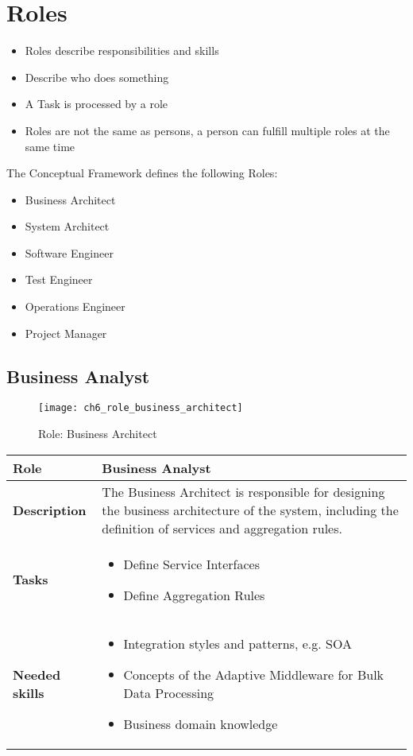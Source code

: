 \section{Roles}
\label{sec:ch6_roles}

\begin{itemize}
	\item Roles describe responsibilities and skills
	\item Describe who does something
	\item A Task is processed by a role
	\item Roles are not the same as persons, a person can fulfill multiple roles at the same time
\end{itemize}

The Conceptual Framework defines the following Roles:
\begin{itemize}
	\item Business Architect
	\item System Architect 
	\item Software Engineer
	\item Test Engineer
	\item Operations Engineer
	\item Project Manager
\end{itemize}

\subsection{Business Analyst}

\begin{figure}[htpb] \centering 
	\texttt{[image: ch6\_role\_business\_architect]} 
	\caption{Role: Business Architect} 
	\label{fig:ch6_role_business_architect} 
\end{figure}

\begin{tabularx}{\textwidth}{@{} l X @{}}
	\caption{Business Architect} \label{table:ch6_Role_Business_Analysist}\\
	\toprule
	\bfseries Role & Business Analyst\\
	\midrule
	\bfseries Description & The Business Architect is responsible for designing the business architecture of the system, including the definition of services and aggregation rules.\\
	\midrule
	\bfseries Tasks & 
	\begin{itemize}
		\item Define Service Interfaces
		\item Define Aggregation Rules
	\end{itemize}
	\\
	\midrule 
	\bfseries Needed skills &
	\begin{itemize}
		\item Integration styles and patterns, e.g. \ac{SOA}
		\item Concepts of the Adaptive Middleware for Bulk Data Processing
		\item Business domain knowledge
	\end{itemize}
	\\
	\bottomrule
\end{tabularx}

